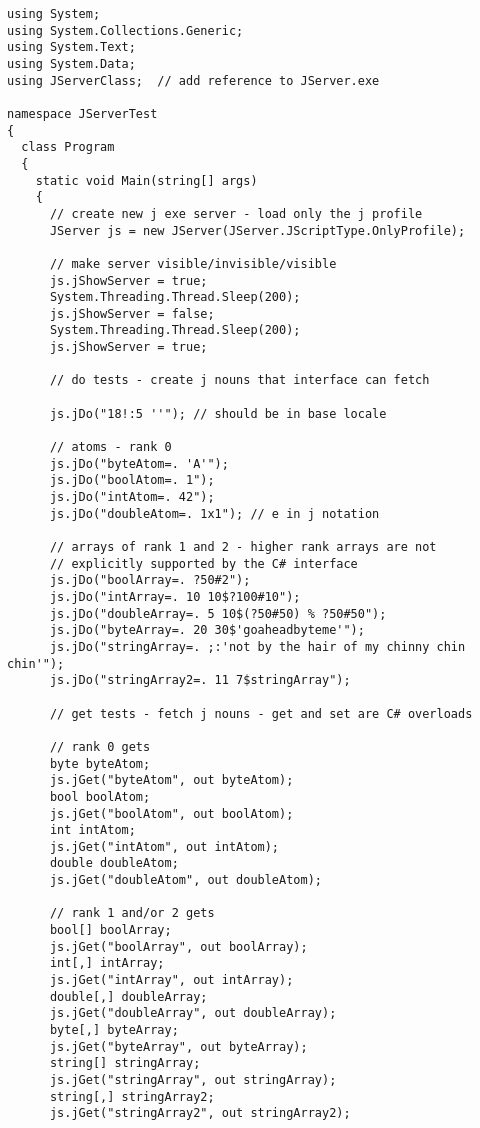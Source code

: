 \lstset{style=sharpc, label=lst:scr537X0}
\begin{lstlisting}
using System;
using System.Collections.Generic;
using System.Text;
using System.Data;
using JServerClass;  // add reference to JServer.exe

namespace JServerTest
{
  class Program
  {
    static void Main(string[] args)
    {
      // create new j exe server - load only the j profile
      JServer js = new JServer(JServer.JScriptType.OnlyProfile);

      // make server visible/invisible/visible
      js.jShowServer = true;
      System.Threading.Thread.Sleep(200);
      js.jShowServer = false;
      System.Threading.Thread.Sleep(200);
      js.jShowServer = true;

      // do tests - create j nouns that interface can fetch

      js.jDo("18!:5 ''"); // should be in base locale

      // atoms - rank 0
      js.jDo("byteAtom=. 'A'");
      js.jDo("boolAtom=. 1");
      js.jDo("intAtom=. 42");
      js.jDo("doubleAtom=. 1x1"); // e in j notation

      // arrays of rank 1 and 2 - higher rank arrays are not
      // explicitly supported by the C# interface
      js.jDo("boolArray=. ?50#2");
      js.jDo("intArray=. 10 10$?100#10");
      js.jDo("doubleArray=. 5 10$(?50#50) % ?50#50");
      js.jDo("byteArray=. 20 30$'goaheadbyteme'");
      js.jDo("stringArray=. ;:'not by the hair of my chinny chin chin'");
      js.jDo("stringArray2=. 11 7$stringArray");

      // get tests - fetch j nouns - get and set are C# overloads

      // rank 0 gets
      byte byteAtom;
      js.jGet("byteAtom", out byteAtom);
      bool boolAtom;
      js.jGet("boolAtom", out boolAtom);
      int intAtom;
      js.jGet("intAtom", out intAtom);
      double doubleAtom;
      js.jGet("doubleAtom", out doubleAtom);

      // rank 1 and/or 2 gets
      bool[] boolArray;
      js.jGet("boolArray", out boolArray);
      int[,] intArray;
      js.jGet("intArray", out intArray);
      double[,] doubleArray;
      js.jGet("doubleArray", out doubleArray);
      byte[,] byteArray;
      js.jGet("byteArray", out byteArray);
      string[] stringArray;
      js.jGet("stringArray", out stringArray);
      string[,] stringArray2;
      js.jGet("stringArray2", out stringArray2);


\end{lstlisting}

